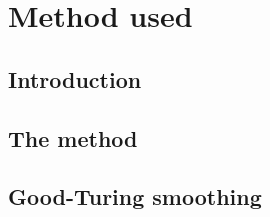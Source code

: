 \section{Method used}
\label{method}

\subsection{Introduction}

\subsection{The method}

\subsection{Good-Turing smoothing}
